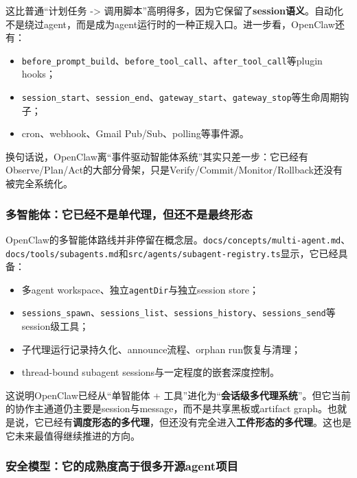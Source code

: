 \documentclass[12pt,a4paper]{article}
\begin{document}
这比普通“计划任务 -> 调用脚本”高明得多，因为它保留了\textbf{session语义}。自动化不是绕过agent，而是成为agent运行时的一种正规入口。进一步看，OpenClaw还有：
\begin{itemize}
    \item \texttt{before\_prompt\_build}、\texttt{before\_tool\_call}、\texttt{after\_tool\_call}等plugin hooks；
    \item \texttt{session\_start}、\texttt{session\_end}、\texttt{gateway\_start}、\texttt{gateway\_stop}等生命周期钩子；
    \item cron、webhook、Gmail Pub/Sub、polling等事件源。
\end{itemize}

换句话说，OpenClaw离“事件驱动智能体系统”其实只差一步：它已经有Observe/Plan/Act的大部分骨架，只是Verify/Commit/Monitor/Rollback还没有被完全系统化。

\subsubsection{多智能体：它已经不是单代理，但还不是最终形态}

OpenClaw的多智能体路线并非停留在概念层。\texttt{docs/concepts/multi-agent.md}、\texttt{docs/tools/subagents.md}和\texttt{src/agents/subagent-registry.ts}显示，它已经具备：

\begin{itemize}
    \item 多agent workspace、独立\texttt{agentDir}与独立session store；
    \item \texttt{sessions\_spawn}、\texttt{sessions\_list}、\texttt{sessions\_history}、\texttt{sessions\_send}等session级工具；
    \item 子代理运行记录持久化、announce流程、orphan run恢复与清理；
    \item thread-bound subagent sessions与一定程度的嵌套深度控制。
\end{itemize}

这说明OpenClaw已经从“单智能体 + 工具”进化为“\textbf{会话级多代理系统}”。但它当前的协作主通道仍主要是session与message，而不是共享黑板或artifact graph。也就是说，它已经有\textbf{调度形态的多代理}，但还没有完全进入\textbf{工件形态的多代理}。这也是它未来最值得继续推进的方向。

\subsubsection{安全模型：它的成熟度高于很多开源agent项目}
\end{document}
